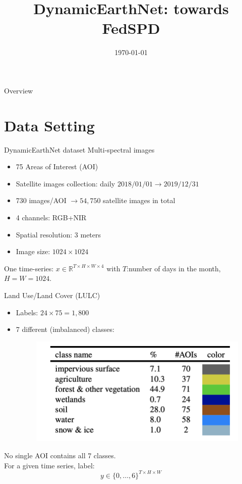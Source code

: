 \documentclass[aspectratio=169,xcolor=dvipsnames]{beamer}
\title{DynamicEarthNet: towards FedSPD}
\subtitle{}
\author{}
\institute{}
\date{\today}
\begin{document}
\begin{frame}
    \titlepage
\end{frame}

\begin{frame}{Overview}
    \tableofcontents
\end{frame}

\section{Data Setting}

\begin{frame}{DynamicEarthNet dataset}
Multi-spectral images
\begin{itemize}
    \item 75 Areas of Interest (AOI)
    \item Satellite images collection: daily $2018/01/01 \to 2019/12/31$
    \item 730 images/AOI $\to 54,750$ satellite images in total
    \item 4 channels: RGB+NIR
    \item Spatial resolution: 3 meters
    \item Image size: $1024 \times 1024$
\end{itemize}
One time-series: $x\in \mathbb{R}^{T\times H \times W \times 4}$ with $T$:number of days in the month, $H=W=1024$.
\end{frame}

\begin{frame}{Land Use/Land Cover (LULC)}
\begin{itemize}
    \item Labels: $24\times 75=1,800$
    \item 7 different (imbalanced) classes:
\begin{figure}
    \centering
    \includegraphics[width=0.5\linewidth]{LULC.png}
\end{figure}
\end{itemize}
No single AOI contains all 7 classes.\\
For a given time series, label:
$$y\in \{0,\dots, 6\}^{T\times H \times W}$$
\end{frame}
\end{document}
